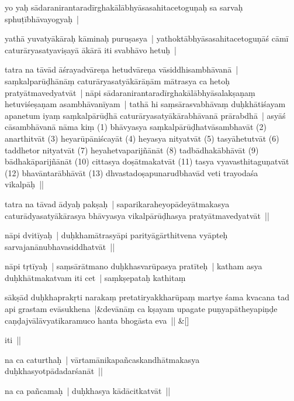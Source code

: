 \documentclass[article,a4paper]{memoir}
\begin{document}
	  \pstart yo yaḥ sā\-daranirantaradī\-rghakā\-lā\-bhyā\-sasahitacetoguṇaḥ sa sarvaḥ sphuṭī\-bhā\-vayogyaḥ | 
	\pend
      

	  \pstart yathā\- yuvatyā\-kā\-raḥ kā\-minaḥ puruṣasya | yathoktā\-bhyā\-sasahitacetoguṇā\-ś cā\-mī\- caturā\-ryasatyaviṣayā\- ā\-kā\-rā\- iti svabhā\-vo hetuḥ | 
	\pend
      

	  \pstart tatra na tā\-vā\-d ā\-śrayadvā\-reṇa hetudvā\-reṇa vā\-siddhisambhā\-vanā\- | saṃkalparū\-ḍhā\-nā\-ṃ caturā\-ryasatyā\-kā\-rā\-ṇā\-m mā\-trasya ca hetoḥ pratyā\-tmavedyatvā\-t | nā\-pi sā\-daranirantaradī\-rghakā\-lā\-bhyā\-salakṣaṇaṃ hetuviśeṣaṇam asambhā\-vanī\-yam | tathā\- hi saṃsā\-rasvabhā\-vaṃ duḥkhā\-tiśayam apanetum iyaṃ saṃkalpā\-rū\-ḍhā\- caturā\-ryasatyā\-kā\-rabhā\-vanā\- prā\-rabdhā\- | asyā\-ś cā\-sambhā\-vanā\- nā\-ma kiṃ (1) bhā\-vyasya saṃkalpā\-rū\-ḍhatvā\-sambhavā\-t (2) anarthitvā\-t (3) heyarū\-pā\-niścayā\-t (4) heyasya nityatvā\-t (5) tasyā\-hetutvā\-t (6) taddhetor nityatvā\-t (7) heyahetvaparijñā\-nā\-t (8) tadbā\-dhakā\-bhā\-vā\-t (9) bā\-dhakā\-parijñā\-nā\-t (10) cittasya doṣā\-tmakatvā\-t (11) tasya vyavasthitaguṇatvā\-t (12) bhavā\-ntarā\-bhā\-vā\-t (13) dhvastadoṣapunarudbhavā\-d veti trayodaśa vikalpā\-ḥ ||
	\pend
      

	  \pstart tatra na tā\-vad ā\-dyaḥ pakṣaḥ | saparikaraheyopā\-deyā\-tmakasya caturā\-dyasatyā\-kā\-rasya bhā\-vyasya vikalpā\-rū\-ḍhasya pratyā\-tmavedyatvā\-t || 
	\pend
      

	  \pstart {}\label{thakur75-2.9} nā\-pi dvitī\-yaḥ | duḥkhamā\-trasyā\-pi parityā\-gā\-rthitvena vyā\-pteḥ sarvajanā\-nubhavasiddhatvā\-t ||
	\pend
      

	  \pstart nā\-pi tṛtī\-yaḥ | saṃsā\-rā\-tmano duḥkhasvarū\-pasya pratī\-teḥ | katham asya duḥkhā\-tmakatvam iti cet | saṃkṣepataḥ kathitaṃ 
	\pend
      
	    
	    \stanza[\smallbreak]
sā\-kṣā\-d duḥkhaprakṛti narakaṃ pretatiryakkharū\-paṃ martye śama kvacana tad api grastam evā\-sukhena |&devā\-nā\-ṃ ca kṣayam upagate puṇyapā\-theyapiṇḍe caṇḍajvā\-lā\-vyatikaramuco hanta bhogā\-sta eva || \&[\smallbreak]


	

	  \pstart iti || 
	\pend
      

	  \pstart na ca caturthaḥ | vā\-rtamā\-nikapañcaskandhā\-tmakasya duḥkhasyotpā\-dadarśanā\-t || 
	\pend
      

	  \pstart na ca pañcamaḥ | duḥkhasya kā\-dā\-citkatvā\-t || 
	\pend
      
\end{document}
